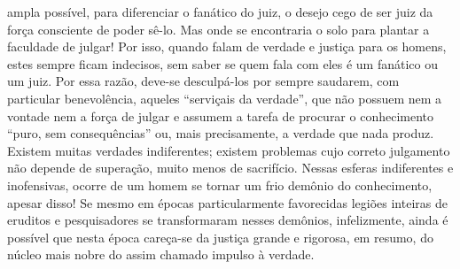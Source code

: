 ampla possível, para diferenciar o fanático do juiz, o desejo cego de
ser juiz da força consciente de poder sê-lo. Mas onde se encontraria
o solo para plantar a faculdade de julgar! Por isso, quando falam de
verdade e justiça para os homens, estes sempre ficam indecisos, sem
saber se quem fala com eles é um fanático ou um juiz. Por essa razão, deve-se
desculpá-los por sempre saudarem, com particular benevolência, aqueles
``serviçais da verdade'', que não possuem nem a vontade nem a força de
julgar e assumem a tarefa de procurar o conhecimento ``puro, sem
consequências'' ou, mais precisamente, a verdade que nada produz.
Existem muitas verdades indiferentes; existem problemas cujo correto
julgamento não depende de superação, muito menos de sacrifício. Nessas
esferas indiferentes e inofensivas, ocorre de um homem se tornar um frio
demônio do conhecimento, apesar disso! Se mesmo em épocas
particularmente favorecidas legiões inteiras de eruditos e pesquisadores
se transformaram nesses demônios, infelizmente, ainda é possível que
nesta época careça-se da justiça grande e rigorosa, em resumo, do núcleo
mais nobre do assim chamado impulso à verdade.

